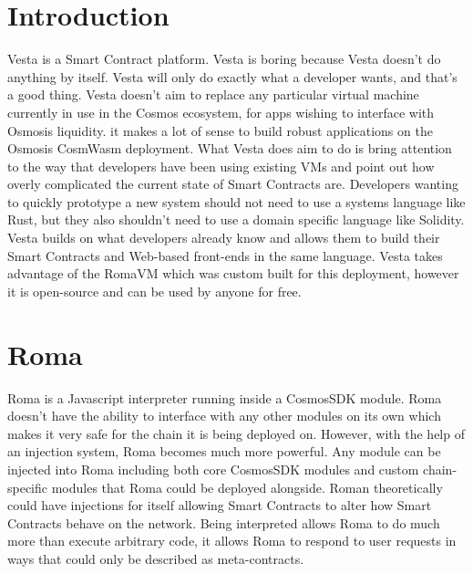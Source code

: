 \documentclass[a4paper]{article}
\begin{document}
\section{Introduction}
Vesta is a Smart Contract platform. Vesta is boring because Vesta doesn’t do anything by itself. Vesta will only do exactly what a developer wants, and that’s a good thing. Vesta doesn’t aim to replace any particular virtual machine currently in use in the Cosmos ecosystem, for apps wishing to interface with Osmosis liquidity. it makes a lot of sense to build robust applications on the Osmosis CosmWasm deployment. What Vesta does aim to do is bring attention to the way that developers have been using existing VMs and point out how overly complicated the current state of Smart Contracts are. Developers wanting to quickly prototype a new system should not need to use a systems language like Rust, but they also shouldn’t need to use a domain specific language like Solidity. Vesta builds on what developers already know and allows them to build their Smart Contracts and Web-based front-ends in the same language. Vesta takes advantage of the RomaVM which was custom built for this deployment, however it is open-source and can be used by anyone for free.

\section{Roma}
Roma is a Javascript interpreter running inside a CosmosSDK module. Roma doesn’t have the ability to interface with any other modules on its own which makes it very safe for the chain it is being deployed on. However, with the help of an injection system, Roma becomes much more powerful. Any module can be injected into Roma including both core CosmosSDK modules and custom chain-specific modules that Roma could be deployed alongside. Roman theoretically could have injections for itself allowing Smart Contracts to alter how Smart Contracts behave on the network. Being interpreted allows Roma to do much more than execute arbitrary code, it allows Roma to respond to user requests in ways that could only be described as meta-contracts.
\end{document}
